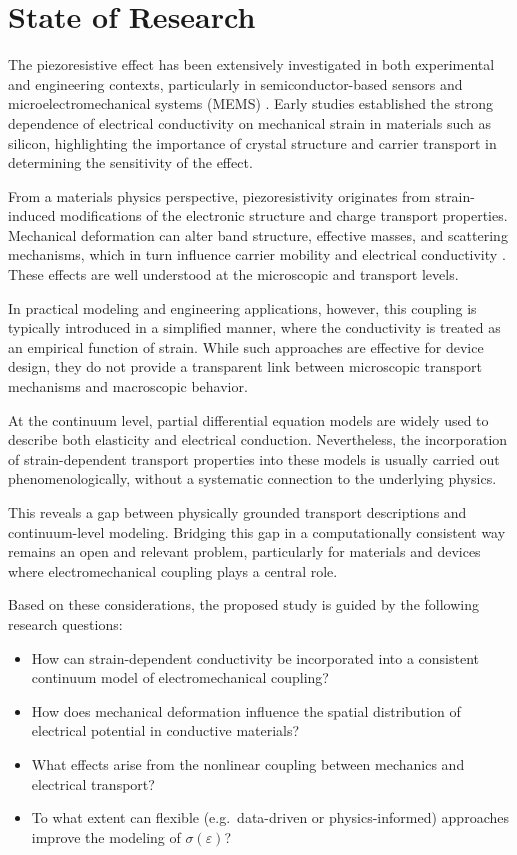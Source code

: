 \section{State of Research}

The piezoresistive effect has been extensively investigated in both experimental and engineering contexts, 
particularly in semiconductor-based sensors and microelectromechanical systems (MEMS) \cite{smith1954,doll2013}. 
Early studies established the strong dependence of electrical conductivity on mechanical strain in materials such as silicon, 
highlighting the importance of crystal structure and carrier transport in determining the sensitivity of the effect.

From a materials physics perspective, piezoresistivity originates from strain-induced modifications of the electronic structure 
and charge transport properties. Mechanical deformation can alter band structure, effective masses, and scattering mechanisms, 
which in turn influence carrier mobility and electrical conductivity \cite{hamaguchi}. 
These effects are well understood at the microscopic and transport levels.

In practical modeling and engineering applications, however, this coupling is typically introduced in a simplified manner, 
where the conductivity is treated as an empirical function of strain. While such approaches are effective for device design, 
they do not provide a transparent link between microscopic transport mechanisms and macroscopic behavior.

At the continuum level, partial differential equation models are widely used to describe both elasticity and electrical conduction. 
Nevertheless, the incorporation of strain-dependent transport properties into these models is usually carried out phenomenologically, 
without a systematic connection to the underlying physics.

This reveals a gap between physically grounded transport descriptions and continuum-level modeling. 
Bridging this gap in a computationally consistent way remains an open and relevant problem, particularly for materials and devices 
where electromechanical coupling plays a central role.

Based on these considerations, the proposed study is guided by the following research questions:

\begin{itemize}
    \item How can strain-dependent conductivity be incorporated into a consistent continuum model of electromechanical coupling?
    \item How does mechanical deformation influence the spatial distribution of electrical potential in conductive materials?
    \item What effects arise from the nonlinear coupling between mechanics and electrical transport?
    \item To what extent can flexible (e.g.\ data-driven or physics-informed) approaches improve the modeling of $\sigma(\varepsilon)$?
\end{itemize}

